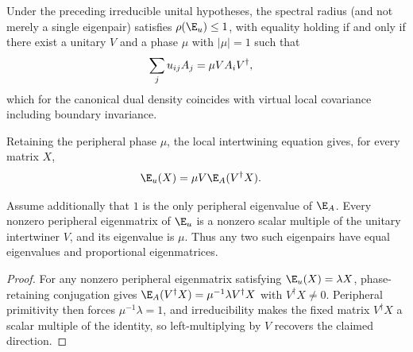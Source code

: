 \begin{lemma}
    \label{thm:irreducible_twisted_spectral_radius}
    \leanok
    Under the preceding irreducible unital hypotheses, the spectral radius
    (and not merely a single eigenpair) satisfies $\rho(\E_u)\leq1$, with
    equality holding if and only if there exist a unitary $V$ and a phase
    $\mu$ with $|\mu|=1$ such that
    \begin{align}
        \sum_j u_{ij}A_j & =\mu V A_i V^\dagger,
        \notag
    \end{align}
    which for the canonical dual density coincides with virtual local
    covariance including boundary invariance.
\end{lemma}

\begin{lemma}
    \label{lem:twisted_transfer_phase_conjugation}
    \leanok
    Retaining the peripheral phase $\mu$, the local intertwining equation gives,
    for every matrix $X$,
    \begin{align}
        \E_u(X) & =\mu V\E_A(V^\dagger X).
        \notag
    \end{align}
\end{lemma}

\begin{lemma}
    \label{thm:twisted_peripheral_eigendirection_unique}
    \leanok
    Assume additionally that $1$ is the only peripheral eigenvalue of
    $\E_A$.  Every nonzero peripheral eigenmatrix of $\E_u$ is a
    nonzero scalar multiple of the unitary intertwiner $V$, and its
    eigenvalue is $\mu$.  Thus any two such eigenpairs have equal
    eigenvalues and proportional eigenmatrices.
\end{lemma}

\begin{proof}
    For any nonzero peripheral eigenmatrix satisfying $\E_u(X)=\lambda X$,
    phase-retaining conjugation gives
    $\E_A(V^\dagger X)=\mu^{-1}\lambda V^\dagger X$ with $V^\dagger X\neq 0$.
    Peripheral primitivity then forces $\mu^{-1}\lambda=1$, and irreducibility
    makes the fixed matrix $V^\dagger X$ a scalar multiple of the identity, so
    left-multiplying by $V$ recovers the claimed direction.
\end{proof}

